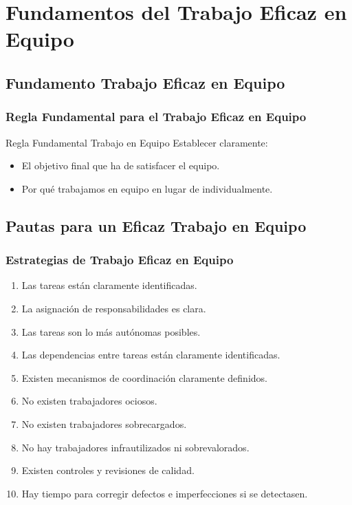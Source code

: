 \documentclass[a4paper,t,xcolor=pst,dvips]{beamer}
\begin{document}
\section{Fundamentos del Trabajo Eficaz en Equipo}

\subsection{Fundamento Trabajo Eficaz en Equipo}

\begin{frame}[c]
	\frametitle{Regla Fundamental para el Trabajo Eficaz en Equipo}
	\begin{block}{Regla Fundamental Trabajo en Equipo}
		Establecer claramente:
		\begin{itemize}
			\item<2-> El objetivo final que ha de satisfacer el equipo.
			\item<3-> Por qué trabajamos en equipo en lugar de individualmente.
		\end{itemize}
	\end{block}
\end{frame}

\subsection{Pautas para un Eficaz Trabajo en Equipo}

\begin{frame}[c]
	\frametitle{Estrategias de Trabajo Eficaz en Equipo}
	\begin{enumerate}[<+->]
		\item Las tareas están claramente identificadas.
		\item La asignación de responsabilidades es clara.
		\item Las tareas son lo más autónomas posibles.
		\item Las dependencias entre tareas están claramente identificadas.
		\item Existen mecanismos de coordinación claramente definidos.
		\item No existen trabajadores ociosos.
		\item No existen trabajadores sobrecargados.
		\item No hay trabajadores infrautilizados ni sobrevalorados.
		\item Existen controles y revisiones de calidad.
		\item Hay tiempo para corregir defectos e imperfecciones si se detectasen.
	\end{enumerate}
\end{frame}
\end{document}
